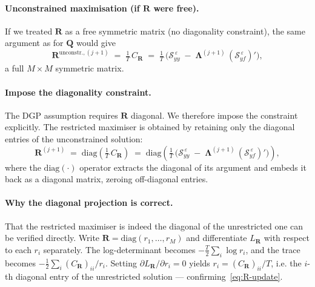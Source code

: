 \documentclass[11pt, a4paper, oneside]{article}
\newcommand{\mL}{\boldsymbol{\Lambda}}
\newcommand{\mR}{\mathbf{R}}
\newcommand{\mQ}{\mathbf{Q}}
\begin{document}
\paragraph{Unconstrained maximisation (if $\mathbf{R}$ were free).}
If we treated $\mR$ as a free symmetric matrix (no diagonality
constraint), the same argument as for $\mQ$ would give
\[
\mR^{\text{unconstr.},(j+1)} \;=\; \tfrac{1}{T}\, C_{\mR}
\;=\; \tfrac{1}{T}\, \Big(\mathcal{S}_{yy}^{\,\varepsilon} \;-\; \mL^{(j+1)}\, (\mathcal{S}_{yf}^{\,\varepsilon})'\Big),
\]
a full $M \times M$ symmetric matrix.

\paragraph{Impose the diagonality constraint.}
The DGP assumption requires $\mR$ diagonal. We therefore impose the
constraint explicitly. The restricted maximiser is obtained by
retaining only the diagonal entries of the unconstrained solution:
\begin{equation}
\boxed{\;\;
\mR^{(j+1)} \;=\; \mathrm{diag}\!\left(\tfrac{1}{T}\, C_{\mR}\right)
\;=\; \mathrm{diag}\!\left(\tfrac{1}{T}\, \Big(\mathcal{S}_{yy}^{\,\varepsilon} \;-\; \mL^{(j+1)}\, (\mathcal{S}_{yf}^{\,\varepsilon})'\Big)\right),
\;\;}
\label{eq:R-update}
\end{equation}
where the $\mathrm{diag}(\cdot)$ operator extracts the diagonal of its
argument and embeds it back as a diagonal matrix, zeroing off-diagonal
entries.

\paragraph{Why the diagonal projection is correct.}
That the restricted maximiser is indeed the diagonal of the
unrestricted one can be verified directly. Write $\mR = \mathrm{diag}(r_1, \ldots, r_M)$
and differentiate $L_{\mR}$ with respect to each $r_i$ separately. The
log-determinant becomes $-\tfrac{T}{2}\sum_i \log r_i$, and the trace
becomes $-\tfrac{1}{2}\sum_i (C_{\mR})_{ii} / r_i$. Setting
$\partial L_{\mR}/\partial r_i = 0$ yields $r_i = (C_{\mR})_{ii} / T$,
i.e. the $i$-th diagonal entry of the unrestricted solution —
confirming~\eqref{eq:R-update}.
\end{document}
